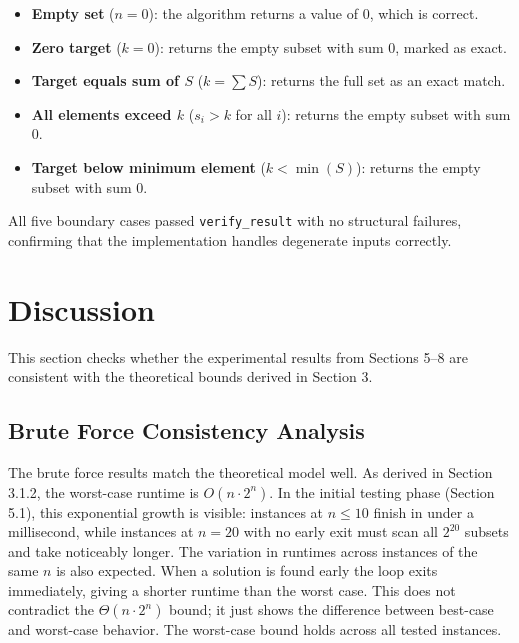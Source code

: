 \documentclass[12pt,a4paper]{article}
\theoremstyle{definition}
\begin{document}
\begin{itemize}[noitemsep]
    \item \textbf{Empty set} ($n = 0$): the algorithm returns a value of 0, which is correct.
    \item \textbf{Zero target} ($k = 0$): returns the empty subset with sum 0, marked as exact.
    \item \textbf{Target equals sum of $S$} ($k = \sum S$): returns the full set as an exact match.
    \item \textbf{All elements exceed $k$} ($s_i > k$ for all $i$): returns the empty subset with sum 0.
    \item \textbf{Target below minimum element} ($k < \min(S)$): returns the empty subset with sum 0.
\end{itemize}

All five boundary cases passed \texttt{verify\_result} with no structural failures, confirming that the implementation handles degenerate inputs correctly.

\section{Discussion}

This section checks whether the experimental results from Sections 5--8 are consistent with the theoretical bounds derived in Section 3.

\subsection{Brute Force Consistency Analysis}

The brute force results match the theoretical model well. As derived in Section 3.1.2, the worst-case runtime is $O(n \cdot 2^n)$. In the initial testing phase (Section 5.1), this exponential growth is visible: instances at $n \le 10$ finish in under a millisecond, while instances at $n = 20$ with no early exit must scan all $2^{20}$ subsets and take noticeably longer. The variation in runtimes across instances of the same $n$ is also expected. When a solution is found early the loop exits immediately, giving a shorter runtime than the worst case. This does not contradict the $\Theta(n \cdot 2^n)$ bound; it just shows the difference between best-case and worst-case behavior. The worst-case bound holds across all tested instances.
\end{document}
